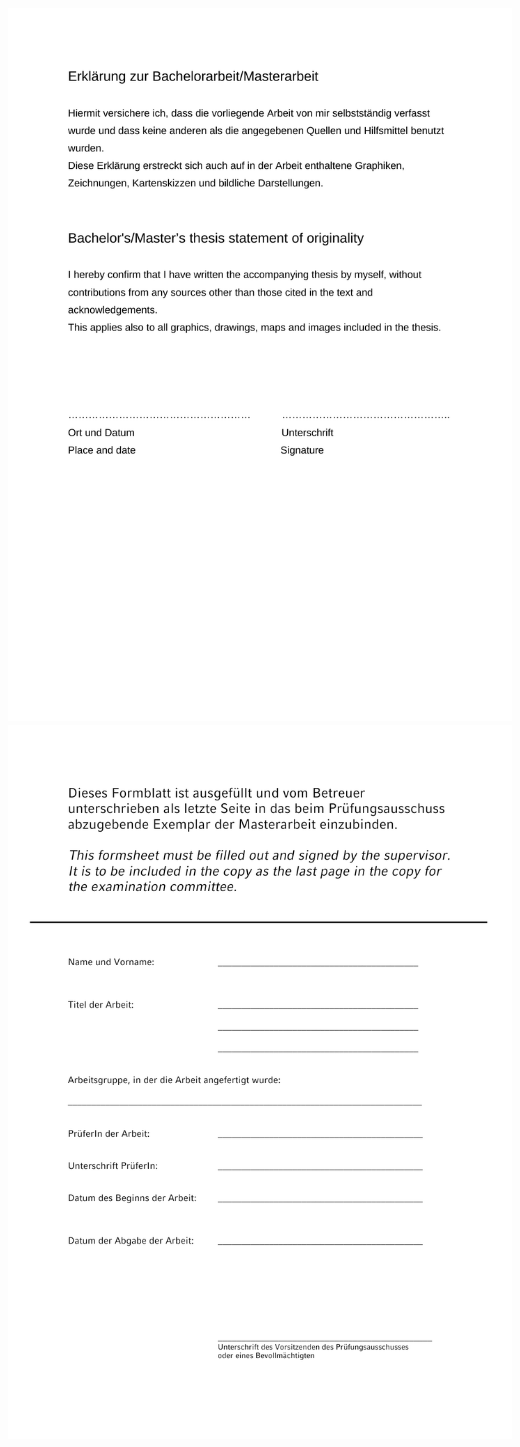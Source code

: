 \documentclass[12pt]{book}
\begin{document}
  
\includegraphics[width=\textwidth]{thesis_statement_original.pdf}
\includegraphics[width=\textwidth]{master-thesis-last-page.pdf}
\end{document}
